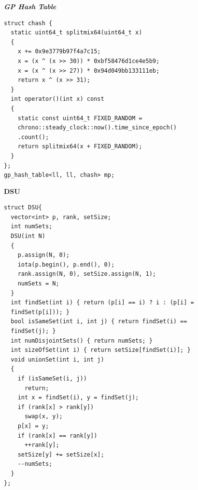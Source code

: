\textbf{\textit{GP Hash Table}}
\begin{lstlisting}
struct chash {
  static uint64_t splitmix64(uint64_t x)
  {
    x += 0x9e3779b97f4a7c15;
    x = (x ^ (x >> 30)) * 0xbf58476d1ce4e5b9;
    x = (x ^ (x >> 27)) * 0x94d049bb133111eb;
    return x ^ (x >> 31);
  }
  int operator()(int x) const
  {
    static const uint64_t FIXED_RANDOM =
    chrono::steady_clock::now().time_since_epoch()
    .count();
    return splitmix64(x + FIXED_RANDOM);
  }
};
gp_hash_table<ll, ll, chash> mp;
\end{lstlisting}

\textbf{DSU}
\begin{lstlisting}
struct DSU{
  vector<int> p, rank, setSize;
  int numSets;
  DSU(int N)
  {
    p.assign(N, 0);
    iota(p.begin(), p.end(), 0);
    rank.assign(N, 0), setSize.assign(N, 1);
    numSets = N;
  }
  int findSet(int i) { return (p[i] == i) ? i : (p[i] =
  findSet(p[i])); }
  bool isSameSet(int i, int j) { return findSet(i) ==
  findSet(j); }
  int numDisjointSets() { return numSets; }
  int sizeOfSet(int i) { return setSize[findSet(i)]; }
  void unionSet(int i, int j)
  {
    if (isSameSet(i, j))
      return;
    int x = findSet(i), y = findSet(j);
    if (rank[x] > rank[y])
      swap(x, y);
    p[x] = y;
    if (rank[x] == rank[y])
      ++rank[y];
    setSize[y] += setSize[x];
    --numSets;
  }
};
\end{lstlisting}
